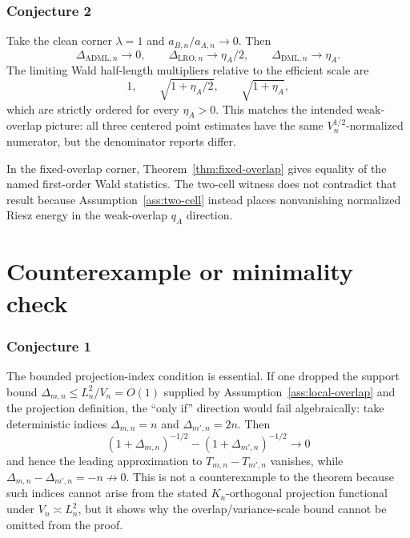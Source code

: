 \documentclass[11pt]{article}
\theoremstyle{definition}
\theoremstyle{plain}
\theoremstyle{remark}
\begin{document}
\subsubsection*{Conjecture 2}
Take the clean corner \(\lambda=1\) and \(a_{B,n}/a_{A,n}\to0\).  Then
\[
  \Delta_{\mathrm{ADML},n}\to0,\qquad
  \Delta_{\mathrm{LRO},n}\to\eta_A/2,\qquad
  \Delta_{\mathrm{DML},n}\to\eta_A.
\]
The limiting Wald half-length multipliers relative to the efficient scale are
\[
  1,\qquad \sqrt{1+\eta_A/2},\qquad \sqrt{1+\eta_A},
\]
which are strictly ordered for every \(\eta_A>0\).  This matches the intended weak-overlap picture: all three centered point estimates have the same \(V_n^{1/2}\)-normalized numerator, but the denominator reports differ.

In the fixed-overlap corner, Theorem~\ref{thm:fixed-overlap} gives equality of the named first-order Wald statistics.  The two-cell witness does not contradict that result because Assumption~\ref{ass:two-cell} instead places nonvanishing normalized Riesz energy in the weak-overlap \(q_A\) direction.

\section{Counterexample or minimality check}
\subsubsection*{Conjecture 1}
The bounded projection-index condition is essential.  If one dropped the
support bound \(\Delta_{m,n}\le L_n^2/V_n=O(1)\) supplied by
Assumption~\ref{ass:local-overlap} and the projection definition, the
``only if'' direction would fail algebraically: take deterministic indices
\(\Delta_{m,n}=n\) and \(\Delta_{m',n}=2n\).  Then
\[
  (1+\Delta_{m,n})^{-1/2}
  -(1+\Delta_{m',n})^{-1/2}\to0
\]
and hence the leading approximation to \(T_{m,n}-T_{m',n}\) vanishes, while
\(\Delta_{m,n}-\Delta_{m',n}=-n\not\to0\).  This is not a counterexample to
the theorem because such indices cannot arise from the stated
\(K_n\)-orthogonal projection functional under \(V_n\asymp L_n^2\), but it
shows why the overlap/variance-scale bound cannot be omitted from the proof.
\end{document}
